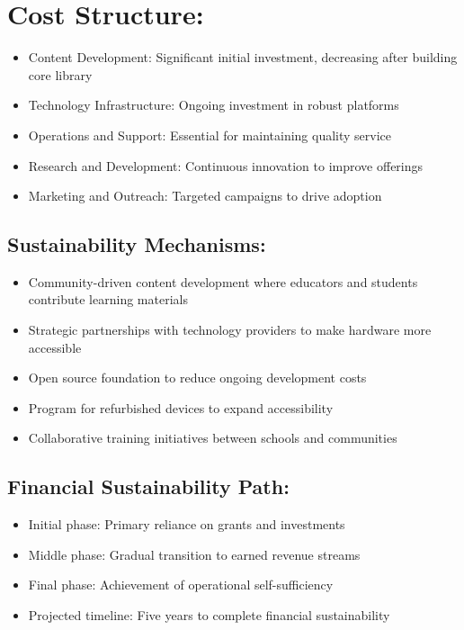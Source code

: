 \documentclass[11pt,                                          %
a4paper,                                       %
twoside]{report}                               %
\begin{document}
\section{Cost Structure:}
\begin{itemize}
	\item Content Development: Significant initial investment, decreasing after building core library
	\item Technology Infrastructure: Ongoing investment in robust platforms
	\item Operations and Support: Essential for maintaining quality service
	\item Research and Development: Continuous innovation to improve offerings
	\item Marketing and Outreach: Targeted campaigns to drive adoption
\end{itemize}

\subsection*{Sustainability Mechanisms:}
\begin{itemize}
	\item Community-driven content development where educators and students contribute learning materials
	\item Strategic partnerships with technology providers to make hardware more accessible
	\item Open source foundation to reduce ongoing development costs
	\item Program for refurbished devices to expand accessibility
	\item Collaborative training initiatives between schools and communities
\end{itemize}

\subsection*{Financial Sustainability Path:}
\begin{itemize}
	\item Initial phase: Primary reliance on grants and investments
	\item Middle phase: Gradual transition to earned revenue streams
	\item Final phase: Achievement of operational self-sufficiency
	\item Projected timeline: Five years to complete financial sustainability
\end{itemize}
\end{document}
